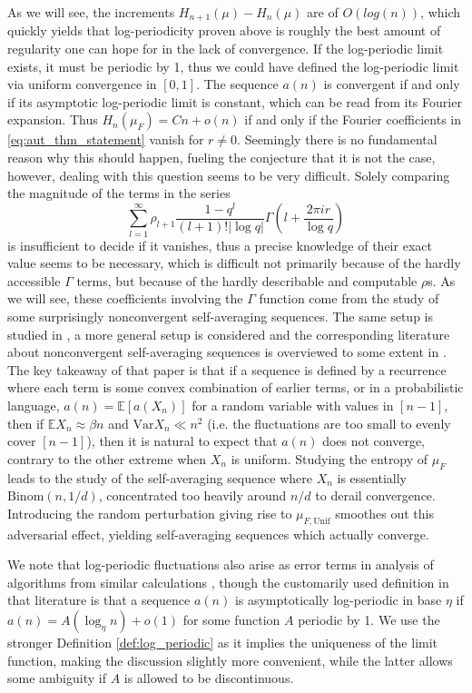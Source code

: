 \documentclass[11pt]{article}
\newcommand{\EE}{\mathbb{E}}
\newcommand{\Unif}{\mathrm{Unif}}
\newcommand{\Binom}{\mathrm{Binom}}
\theoremstyle{definition}
\begin{document}
As we will see, the increments $H_{n+1}(\mu) -H_n(\mu)$ are of $O(log(n))$, which quickly yields that log-periodicity proven above is roughly the best amount of regularity one can hope for in the lack of convergence. If the log-periodic limit exists, it must be periodic by 1, thus we could have defined the log-periodic limit via uniform convergence in $[0, 1]$. The sequence $a(n)$ is convergent if and only if its asymptotic log-periodic limit is constant, which can be read from its Fourier expansion. Thus $H_n(\mu_F)=Cn+o(n)$ if and only if the Fourier coefficients in \eqref{eq:aut_thm_statement} vanish for $r\neq 0$. Seemingly there is no fundamental reason why this should happen, fueling the conjecture that it is not the case, however, dealing with this question seems to be very difficult. Solely comparing the magnitude of the terms in the series
$$\sum_{l=1}^{\infty}\rho_{l+1}\frac{1-q^l}{(l+1)! |\log q|}\Gamma\left(l+\frac{2\pi i r}{\log q}\right)$$
is insufficient to decide if it vanishes, thus a precise knowledge of their exact value seems to be necessary, which is difficult not primarily because of the hardly accessible $\Gamma$ terms, but because of the hardly describable and computable $\rho$s. As we will see, these coefficients involving the $\Gamma$ function come from the study of some surprisingly nonconvergent self-averaging sequences. The same setup is studied in \cite{ESS1993}, a more general setup is considered and the corresponding literature about nonconvergent self-averaging sequences is overviewed to some extent in \cite{self-averaging}. The key takeaway of that paper is that if a sequence is defined by a recurrence where each term is some convex combination of earlier terms, or in a probabilistic language, $a(n) = \EE[a(X_n)]$ for a random variable with values in $[n-1]$, then if $\EE X_n \approx \beta n$ and $\mathrm{Var} X_n\ll n^2$ (i.e. the fluctuations are too small to evenly cover $[n-1]$), then it is natural to expect that $a(n)$ does not converge, contrary to the other extreme when $X_n$ is uniform. Studying the entropy of $\mu_F$ leads to the study of the self-averaging sequence where $X_n$ is essentially $\Binom(n, 1/d)$, concentrated too heavily around $n/d$ to derail convergence. Introducing the random perturbation giving rise to $\mu_{F, \Unif}$ smoothes out this adversarial effect, yielding self-averaging sequences which actually converge.

We note that log-periodic fluctuations also arise as error terms in analysis of algorithms from similar calculations \cite{logperiodicalgorithms}, though the customarily used definition in that literature is that a sequence $a(n)$ is asymptotically log-periodic in base $\eta$ if $a(n)=A(\log_\eta n)+o(1)$ for some function $A$ periodic by 1. We use the stronger Definition \ref{def:log_periodic} as it implies the uniqueness of the limit function, making the discussion slightly more convenient, while the latter allows some ambiguity if $A$ is allowed to be discontinuous.
\end{document}

